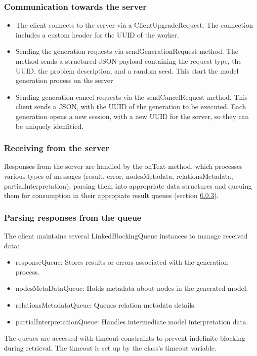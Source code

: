 			\subsubsection{Communication towards the server} 
				\begin{itemize}
					\item The client connects to the server via a ClientUpgradeRequest. The connection includes a custom header for the UUID of the worker.
					\item Sending the generation requests via sendGenerationRequest method. The method sends a structured JSON payload containing the request type,
					the UUID, the problem description, and a random seed. This start the model generation process on the server
					\item \label{clientcancel}Sending generation cancel requests via the sendCancelRequest method. This client sends a JSON, with the UUID of the generation to be 
					executed. Each generation opens a new session, with a new UUID for the server, so they can be uniquely idenfitied.
				\end{itemize} 
			\subsubsection{Receiving from the server} 
				Responses from the server are handled by the onText method, which processes various types of messages 
				(result, error, nodesMetadata, relationsMetadata, partialInterpretation), parsing them into appropriate data 
				structures and queuing them for consumption in their appropiate result queues (section \ref{resultqueues}).

			\subsubsection{Parsing responses from the queue} \label{resultqueues}
				The client maintains several LinkedBlockingQueue instances to manage received data:
				\begin{itemize}
					\item responseQueue: Stores results or errors associated with the generation process.
					\item nodesMetaDataQueue: Holds metadata about nodes in the generated model.
					\item relationsMetadataQueue: Queues relation metadata details.
					\item partialInterpretationQueue: Handles intermediate model interpretation data.
				\end{itemize} 
				The queues are accessed with timeout constraints to prevent indefinite blocking during retrieval. The timeout is set up by the class's
				timeout variable. 
				
